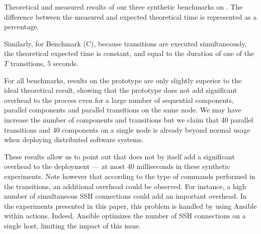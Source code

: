 \begin{table}
	\begin{center}
		
		\caption{Theoretical and measured results of our three synthetic 
		benchmarks on \ecotype. The difference between the measured and expected 
		theoretical time is represented as a percentage.}
		\label{tab:resultssynt}
	\end{center}
\end{table}

Similarly, for Benchmark (C), because transitions are executed
simultaneously, the theoretical expected time is constant, and equal
to the duration of one of the $T$ transitions, \ie $5$ seconds.

For all benchmarks, results on the \mad prototype are only slightly
superior to the ideal theoretical result, showing that the prototype
does not add significant overhead to the process even for a large
number of sequential components, parallel components and parallel
transitions on the same node.  We may have increase the number of
components and transitions but we claim that 40 parallel transitions
and 40 components on a single node is already beyond normal usage when
deploying distributed software systems.


These results allow us to point out that \mad does not by itself add a
significant overhead to the deployment --- at most 40 milliseconds in
these synthetic experiments. Note however that according to the
type of commands performed in the transitions, an additional overhead
could be observed. For instance, a high number of simultaneous SSH
connections could add an important overhead. In the experiments
presented in this paper, this problem is handled by using Ansible
within actions. Indeed, Ansible optimizes the number of SSH
connections on a single host, limiting the impact of this issue.


